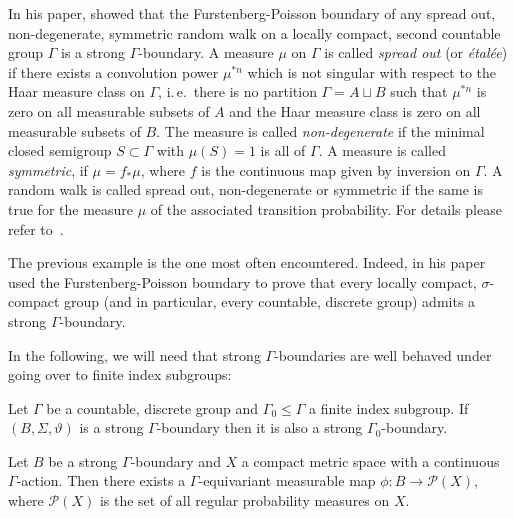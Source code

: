 \begin{bsp}
  \label{bsp:poisson}
  In his paper, \textcite[Theorem 3]{MR2006560} showed that the Furstenberg-Poisson boundary of any spread out, non-degenerate, symmetric random walk on a locally compact, second countable group \(\Gamma\) is a strong \(\Gamma\)-boundary. A measure \(\mu\) on \(\Gamma\) is called \emph{spread out} (or \emph{étalée}) if there exists a convolution power \(\mu^{\ast n}\) which is not singular with respect to the Haar measure class on \(\Gamma\), i.\,e.\ there is no partition \(\Gamma = A \sqcup B\) such that \(\mu^{\ast n}\) is zero on all measurable subsets of \(A\) and the Haar measure class is zero on all measurable subsets of \(B\). The measure is called \emph{non-degenerate} if the minimal closed semigroup \(S \subset \Gamma\) with \(\mu(S) = 1\) is all of \(\Gamma\). A measure is called \emph{symmetric}, if \(\mu = f_\ast \mu\), where \(f\) is the continuous map given by inversion on \(\Gamma\). A random walk is called spread out, non-degenerate or symmetric if the same is true for the measure \(\mu\) of the associated transition probability. For details please refer to~\cite[Section 3]{MR2006560}.
\end{bsp}

\begin{rem}
  The previous example is the one most often encountered. Indeed, in his paper \textcite{MR2006560} used the Furstenberg-Poisson boundary to prove that every locally compact, \(\sigma\)-compact group (and in particular, every countable, discrete group) admits a strong \(\Gamma\)-boundary. 
\end{rem}

In the following, we will need that strong \(\Gamma\)-boundaries are well behaved under going over to finite index subgroups:

\begin{thm}
  \label{thm:str-bnd-subgrp}
  Let \(\Gamma\) be a countable, discrete group and \(\Gamma_0 \leq \Gamma\) a finite index subgroup. If \((B, \Sigma, \vartheta)\) is a strong \(\Gamma\)-boundary then it is also a strong \(\Gamma_0\)-boundary.
\end{thm}

\begin{thm}
  \label{thm:p(x)}
  Let \(B\) be a strong \(\Gamma\)-boundary and \(X\) a compact metric space with a continuous \(\Gamma\)-action. Then there exists a \(\Gamma\)-equivariant measurable map \(\phi \colon B \to \mathcal{P}(X)\), where \(\mathcal{P}(X)\) is the set of all regular probability measures on \(X\).
\end{thm}

